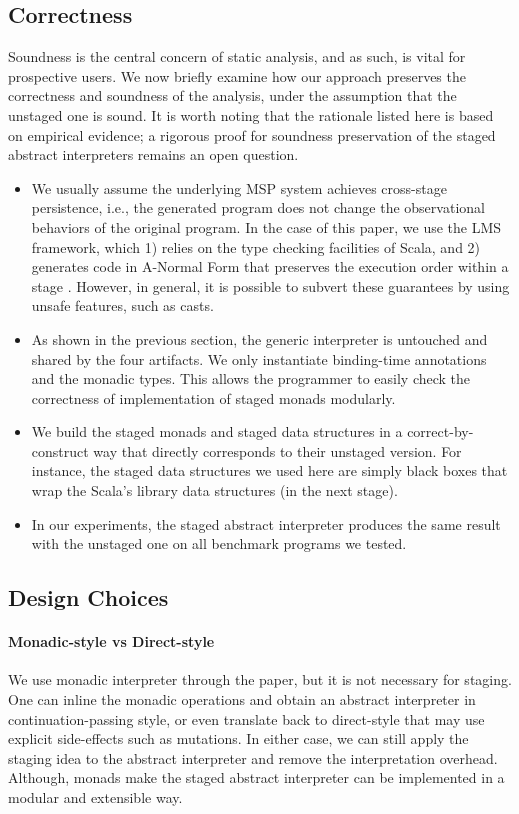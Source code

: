 \subsection{Correctness}

Soundness is the central concern of static analysis, and as such, is vital
for prospective users. We now briefly examine how our
approach preserves the correctness and soundness of the analysis, under the
assumption that the unstaged one is sound. It is worth noting that the rationale
listed here is based on empirical evidence; a rigorous proof for soundness
preservation of the staged abstract interpreters remains an open question.

\begin{itemize}
  \item We usually assume the underlying MSP system achieves cross-stage
    persistence, i.e., the generated program does not change the observational
    behaviors of the original program. In the case of this paper, we use the
    LMS framework, which 1) relies on the type checking facilities of Scala, and
    2) generates code in A-Normal Form \cite{Flanagan:1993:ECC:155090.155113}
    that preserves the execution order within a stage \cite{DBLP:conf/birthday/Rompf16}.
    However, in general, it is possible to subvert these guarantees by
    using unsafe features, such as casts.
  \item As shown in the previous section, the generic interpreter is untouched
    and shared by the four artifacts. We only instantiate binding-time
    annotations and the monadic types. This allows the programmer to easily
    check the correctness of implementation of staged monads modularly.
  \item We build the staged monads and staged data structures in a
    correct-by-construct way that directly corresponds to their unstaged
    version. For instance, the staged data structures we used here are simply
    black boxes that wrap the Scala's library data structures (in the next
    stage).
  \item In our experiments, the staged abstract interpreter produces the same
    result with the unstaged one on all benchmark programs we tested.
\end{itemize}

\subsection{Design Choices}

\paragraph{Monadic-style vs Direct-style} We use monadic interpreter through the paper,
but it is not necessary for staging. One can inline the monadic
operations and obtain an abstract interpreter in continuation-passing
style, or even translate back to direct-style that may use explicit
side-effects such as mutations. In either case, we can still apply the
staging idea to the abstract interpreter and remove the interpretation
overhead. Although, monads make the staged abstract interpreter can be
implemented in a modular and extensible way.


